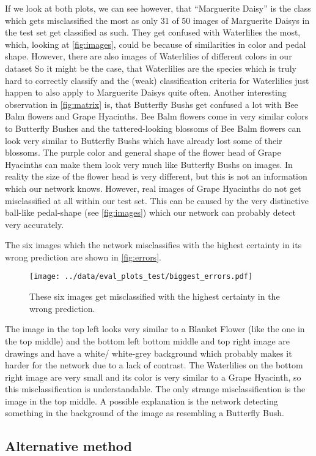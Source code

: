 If we look at both plots, we can see however, that \enquote{Marguerite Daisy} is the class which gets misclassified the most as only 31 of 50 images of Marguerite Daisys in the test set get 
classified as such.
They get confused with Waterlilies the most, which, looking at \autoref{fig:images}, could be because of similarities in color and pedal shape.
However, there are also images of Waterlilies of different colors in our dataset
So it might be the case, that Waterlilies are the species which is truly hard to correctly classify and the (weak) classification criteria for Waterlilies just happen to also apply to Marguerite Daisys
quite often.
Another interesting observation in \autoref{fig:matrix} is, that Butterfly Bushs get confused a lot with Bee Balm flowers and Grape Hyacinths.
Bee Balm flowers come in very similar colors to Butterfly Bushes and the tattered-looking blossoms of Bee Balm flowers can look very similar to Butterfly Bushs which have already lost some of their 
blossoms.
The purple color and general shape of the flower head of Grape Hyacinths can make them look very much like Butterfly Bushs on images.
In reality the size of the flower head is very different, but this is not an information which our network knows.
However, real images of Grape Hyacinths do not get misclassified at all within our test set.
This can be caused by the very distinctive ball-like pedal-shape (see \autoref{fig:images}) which our network can probably detect very accurately. 

The six images which the network misclassifies with the highest certainty in its wrong prediction are shown in \autoref{fig:errors}.
\begin{figure}
    \centering
    \texttt{[image: ../data/eval\_plots\_test/biggest\_errors.pdf]}
    \caption{These six images get misclassified with the highest certainty in the wrong prediction.}
    \label{fig:errors}
\end{figure}
The image in the top left looks very similar to a Blanket Flower (like the one in the top middle) and the bottom left bottom middle and top right image are drawings and have
a white/ white-grey background which probably makes it harder for the network due to a lack of contrast.
The Waterlilies on the bottom right image are very small and its color is very similar to a Grape Hyacinth, so this misclassification is understandable.
The only strange misclassification is the image in the top middle.
A possible explanation is the network detecting something in the background of the image as resembling a Butterfly Bush.


\subsection{Alternative method}